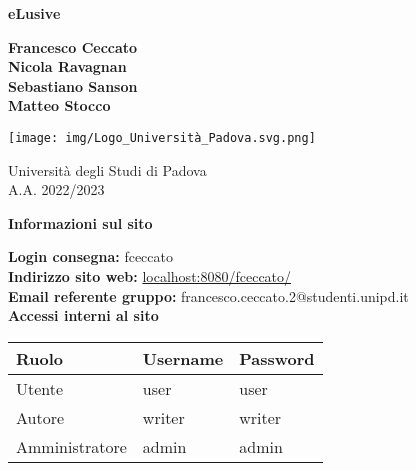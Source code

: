 \documentclass[11pt, a4paper]{article}
\begin{document}
\begin{titlepage}
    \begin{center}
        \vspace*{1cm}
            
        \Huge
        \textbf{eLusive}
            
        \vspace{1.5cm}
        
        \Large
        \textbf{Francesco Ceccato} \\
        \textbf{Nicola Ravagnan} \\
        \textbf{Sebastiano Sanson} \\
        \textbf{Matteo Stocco}
            
        \vfill
            
        \vspace{0.8cm}
            
       \texttt{[image: img/Logo\_Università\_Padova.svg.png]}
            
        \Large
        Università degli Studi di Padova \\
        A.A. 2022/2023
            
    \end{center}
\end{titlepage}


\clearpage

\begin{center}
	\textbf{\Large{Informazioni sul sito}}

    \vspace{0.5cm}

	\textbf{Login consegna:} fceccato \\
	\textbf{Indirizzo sito web:} \url{localhost:8080/fceccato/}\\
	\textbf{Email referente gruppo:} francesco.ceccato.2@studenti.unipd.it \\
    \vspace{1cm}
    \textbf{Accessi interni al sito}
    \begin{longtable}{|l|l|l|}
        \hline
        \rowcolor[HTML]{220058}
        {\color[HTML]{FFFFFF} Ruolo} & {\color[HTML]{FFFFFF} Username} & {\color[HTML]{FFFFFF} Password} \\ \hline
        Utente         & user     & user    \\ \hline
        Autore         & writer   & writer  \\ \hline
        Amministratore & admin    & admin   \\ \hline
    \end{longtable}
\end{center}

\clearpage  

\tableofcontents

\clearpage











\end{document}
